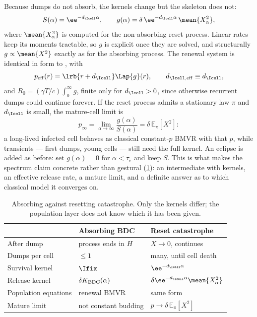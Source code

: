 Because dumps do not absorb, the kernels change but the skeleton does not:
\begin{equation}
S(\alpha)=\ee^{-d_{\Icell}\alpha},
\qquad
g(\alpha)=\delta\,\ee^{-d_{\Icell}\alpha}\,\mean{X_\alpha^2},
\label{p:eq:reset-kernels}
\end{equation}
where $\mean{X_\alpha^2}$ is computed for the non-absorbing reset process.
Linear rates keep its moments tractable, so $g$ is explicit once they are
solved, and structurally $g\propto\mean{X^2}$ exactly as for the absorbing
process. The renewal system is identical in form to
, with
\begin{equation}
p_{\rm eff}(r)=\lrb{r+d_{\Icell}}\Lap{g}(r),
\qquad
d_{\Icell,{\rm eff}}\equiv d_{\Icell},
\label{p:eq:reset-peff}
\end{equation}
and $R_0=(\gamma T/c)\int_0^\infty g$, finite only for $d_{\Icell}>0$, since
otherwise recurrent dumps could continue forever. If the reset process
admits a stationary law $\pi$ and $d_{\Icell}$ is small, the mature-cell
limit is
\begin{equation}
p_\infty=\lim_{\alpha\to\infty}\frac{g(\alpha)}{S(\alpha)}
=\delta\,\mathbb{E}_\pi[X^2]:
\label{p:eq:reset-mature}
\end{equation}
a long-lived infected cell behaves as classical constant-$p$ BMVR with that
$p$, while transients --- first dumps, young cells --- still need the full
kernel. An eclipse is added as before: set $g(\alpha)=0$ for $\alpha<\tau_e$
and keep $S$. This is what makes the spectrum claim concrete rather than
gestural (\cref{p:tab:reset}): an intermediate with kernels, an effective
release rate, a mature limit, and a definite answer as to which classical
model it converges on.

\begin{table}[htbp]
\centering
\renewcommand{\arraystretch}{1.1}
\small
\begin{tabular}{@{}lll@{}}
\toprule
 & Absorbing BDC & Reset catastrophe \\
\midrule
After dump & process ends in $H$ & $X\to0$, continues \\
Dumps per cell & $\le1$ & many, until cell death \\
Survival kernel & $\Ifix$ & $\ee^{-d_{\Icell}\alpha}$ \\
Release kernel & $\delta K_{\rm BDC}(\alpha)$ & $\delta \ee^{-d_{\Icell}\alpha}\mean{X_\alpha^2}$ \\
Population equations & renewal BMVR & same form \\
Mature limit & not constant budding & $p\to\delta\,\mathbb{E}_\pi[X^2]$ \\
\bottomrule
\end{tabular}
\caption{Absorbing against resetting catastrophe. Only the kernels differ;
the population layer does not know which it has been given.}
\label{p:tab:reset}
\end{table}

